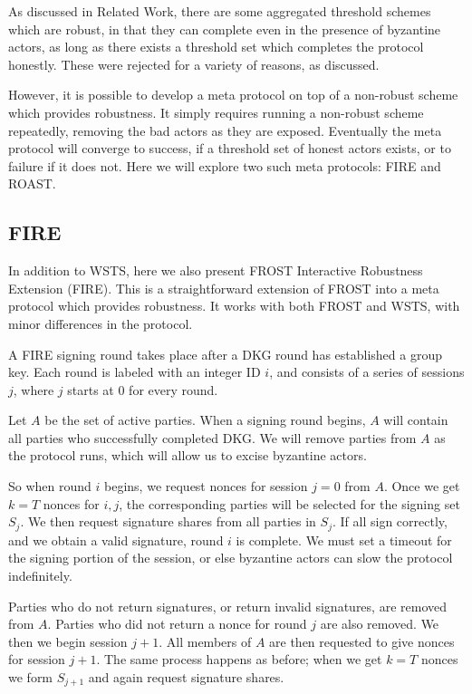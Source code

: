 \documentclass{article}
\begin{document}
As discussed in Related Work, there are some aggregated threshold schemes which are robust, in that they can complete even in the presence of byzantine actors, as long as there exists a threshold set which completes the protocol honestly.  These were rejected for a variety of reasons, as discussed.

However, it is possible to develop a meta protocol on top of a non-robust scheme which provides robustness.  It simply requires running a non-robust scheme repeatedly, removing the bad actors as they are exposed.  Eventually the meta protocol will converge to success, if a threshold set of honest actors exists, or to failure if it does not.  Here we will explore two such meta protocols: FIRE and ROAST.

\subsection{
  FIRE
}

In addition to WSTS, here we also present FROST Interactive Robustness Extension (FIRE).  This is a straightforward extension of FROST into a meta protocol which provides robustness.  It works with both FROST and WSTS, with minor differences in the protocol.

A FIRE signing round takes place after a DKG round has established a group key.  Each round is labeled with an integer ID $i$, and consists of a series of sessions $j$, where $j$ starts at $0$ for every round.

Let $A$ be the set of active parties.  When a signing round begins, $A$ will contain all parties who successfully completed DKG.  We will remove parties from $A$ as the protocol runs, which will allow us to excise byzantine actors.

So when round $i$ begins, we request nonces for session $j = 0$ from $A$.  Once we get $k = T$ nonces for $i,j$, the corresponding parties will be selected for the signing set $S_j$.  We then request signature shares from all parties in $S_j$.  If all sign correctly, and we obtain a valid signature, round $i$ is complete.  We must set a timeout for the signing portion of the session, or else byzantine actors can slow the protocol indefinitely.

Parties who do not return signatures, or return invalid signatures, are removed from $A$.  Parties who did not return a nonce for round $j$ are also removed.  We then we begin session $j+1$.  All members of $A$ are then requested to give nonces for session $j+1$.  The same process happens as before; when we get $k = T$ nonces we form $S_{j+1}$ and again request signature shares.
\end{document}
